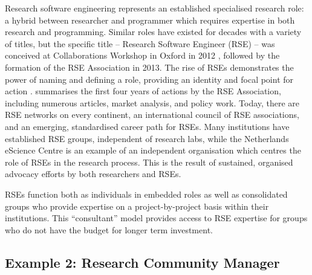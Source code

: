 \documentclass[authordate,meta]{jote-new-article}
\begin{document}
Research software engineering represents an established specialised research role: a hybrid between researcher and programmer which requires expertise in both research and programming. Similar roles have existed for decades with a variety of titles, but the specific title -- Research Software Engineer (RSE) -- was conceived at Collaborations Workshop in Oxford in 2012 \parencites{Hettrick2016}, followed by the formation of the RSE Association in 2013. The rise of RSEs demonstrates the power of naming and defining a role, providing an identity and focal point for action \parencites{Sims2021}. \textcite{Hettrick2016} summarises the first four years of actions by the RSE Association, including numerous articles, market analysis, and policy work. Today, there are RSE networks on every continent, an international council of RSE associations, and an emerging, standardised career path for RSEs. Many institutions have established RSE groups, independent of research labs, while the Netherlands eScience Centre is an example of an independent organisation which centres the role of RSEs in the research process. This is the result of sustained, organised advocacy efforts by both researchers and RSEs.







RSEs function both as individuals in embedded roles as well as consolidated groups who provide expertise on a project-by-project basis within their institutions. This “consultant” model provides access to RSE expertise for groups who do not have the budget for longer term investment.



\subsection{Example 2: Research Community Manager}
\end{document}
